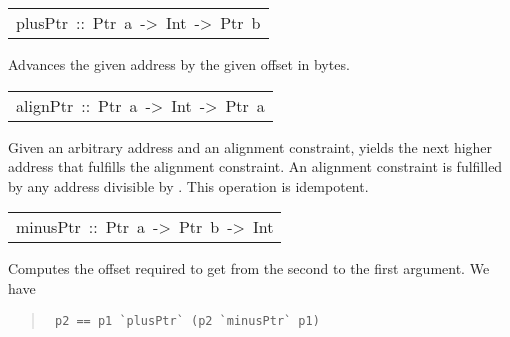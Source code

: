 \begin{haddockdesc}
\item[\begin{tabular}{@{}l}
plusPtr\ ::\ Ptr\ a\ ->\ Int\ ->\ Ptr\ b
\end{tabular}]\haddockbegindoc
Advances the given address by the given offset in bytes.
\par

\end{haddockdesc}
\begin{haddockdesc}
\item[\begin{tabular}{@{}l}
alignPtr\ ::\ Ptr\ a\ ->\ Int\ ->\ Ptr\ a
\end{tabular}]\haddockbegindoc
Given an arbitrary address and an alignment constraint,
  yields the next higher address that fulfills the
 alignment constraint.  An alignment constraint  is fulfilled by
 any address divisible by .  This operation is idempotent.
\par

\end{haddockdesc}
\begin{haddockdesc}
\item[\begin{tabular}{@{}l}
minusPtr\ ::\ Ptr\ a\ ->\ Ptr\ b\ ->\ Int
\end{tabular}]\haddockbegindoc
Computes the offset required to get from the second to the first
 argument.  We have 
\par
\begin{quote}
{\haddockverb\begin{verbatim}
 p2 == p1 `plusPtr` (p2 `minusPtr` p1)
\end{verbatim}}
\end{quote}

\end{haddockdesc}
